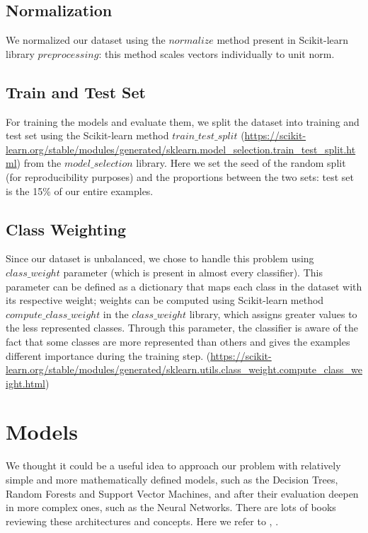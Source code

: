 \documentclass[12pt]{article}
\begin{document}
\subsection{Normalization}
We normalized our dataset using the $normalize$ method present in Scikit-learn library $preprocessing$: this method scales vectors individually to unit norm. 


\subsection{Train and Test Set}

For training the models and evaluate them, we split the dataset into training and test set using the Scikit-learn method $train\_test\_split$ (\url{https://scikit-learn.org/stable/modules/generated/sklearn.model_selection.train_test_split.html}) from the $model\_selection$ library. Here we set the seed of the random split (for reproducibility purposes) and the proportions between the two sets: test set is the 15\% of our entire examples.


\subsection{Class Weighting}
Since our dataset is unbalanced, we chose to handle this problem using $class\_weight$ parameter (which is present in almost every classifier). This parameter can be defined as a dictionary that maps each class in the dataset with its respective weight; weights can be computed using Scikit-learn method $compute\_class\_weight$ in the $class\_weight$ library, which assigns greater values to the less represented classes. Through this parameter, the classifier is aware of the fact that some classes are more represented than others and gives the examples different importance during the training step.
(\url{https://scikit-learn.org/stable/modules/generated/sklearn.utils.class_weight.compute_class_weight.html})

\newpage
\section{Models}
We thought it could be a useful idea to approach our problem with relatively simple and more mathematically defined models, such as the Decision Trees, Random Forests and Support Vector Machines, and after their evaluation deepen in more complex ones, such as the Neural Networks. 
There are lots of books reviewing these architectures and concepts. Here we refer to \cite{geron2017hands} , \cite{bishop2006pattern} \cite{hertz1991introduction}.
\end{document}
